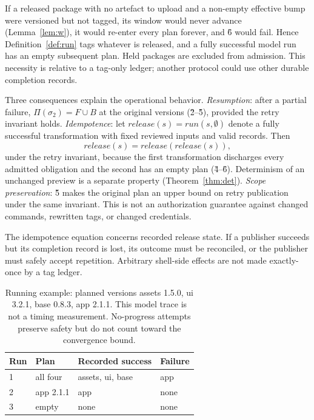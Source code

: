 \begin{proposition}
\label{prop:tagall}
If a released package with no artefact to upload and a non-empty effective
bump were versioned but not tagged, its window would never advance
(Lemma~\ref{lem:w}), it would re-enter every plan forever, and \G{6} would
fail. Hence
Definition~\ref{def:run} tags whatever is released, and a fully successful model run has an empty subsequent plan. Held
packages are excluded from admission. This necessity is relative to a
tag-only ledger; another protocol could use other durable completion records.
\end{proposition}

Three consequences explain the operational behavior. \emph{Resumption}:
after a partial failure, $\Pi(\sigma_2)=F\cup B$ at the original versions
(\G{2}--\G{5}), provided the retry invariant holds. \emph{Idempotence}:
let $\mathit{release}(s)=\mathit{run}(s,\emptyset)$ denote a fully successful
transformation with fixed reviewed inputs and valid records. Then
\[
  \mathit{release}(s)=\mathit{release}(\mathit{release}(s)),
\]
under the retry invariant, because the first transformation discharges every
admitted obligation and the second has an empty plan (\G{4}--\G{6}). Determinism of an unchanged preview is a
separate property (Theorem~\ref{thm:det}). \emph{Scope preservation}: \G{5}
makes the original plan an upper bound on retry publication under the same
invariant. This is not an authorization guarantee against changed commands,
rewritten tags, or changed credentials.

The idempotence equation concerns recorded release state. If a publisher
succeeds but its completion record is lost, its outcome must be reconciled,
or the publisher must safely accept repetition. Arbitrary shell-side effects
are not made exactly-once by a tag ledger.


\begin{table}[t]
\centering
\caption{Running example: planned versions assets 1.5.0, ui 3.2.1, base
0.8.3, app 2.1.1. This model trace is not a timing measurement. No-progress
attempts preserve safety but do not count toward the convergence bound.}
\label{tab:runs}
\small
\begin{tabular}{@{}llll@{}}
\toprule
Run & Plan & Recorded success & Failure \\
\midrule
1 & all four & assets, ui, base & app \\
2 & app 2.1.1 & app & none \\
3 & empty & none & none \\
\bottomrule
\end{tabular}
\end{table}

